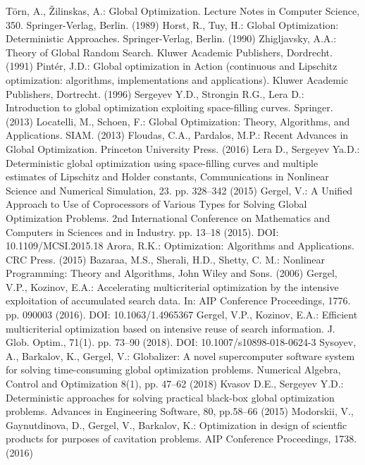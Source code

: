 \documentclass[smallextended]{svjour3}       %
\begin{document}
\begin{thebibliography}{}
 T\"orn, A., {\v Z}ilinskas, A.: Global Optimization. Lecture Notes in Computer Science, 350. Springer-Verlag, Berlin. (1989)
 Horst, R., Tuy, H.: Global Optimization: Deterministic Approaches. Springer-Verlag, Berlin. (1990)
 Zhigljavsky, A.A.: Theory of Global Random Search. Kluwer Academic Publishers, Dordrecht. (1991)
 Pint\'er, J.D.: Global optimization in Action (continuous and Lipschitz optimization: algorithms, implementations and applications). Kluwer Academic Publishers, Dortrecht. (1996)
 Sergeyev Y.D., Strongin R.G., Lera D.: Introduction to global optimization exploiting space-filling curves. Springer. (2013)
 Locatelli, M., Schoen, F.: Global Optimization: Theory, Algorithms, and Applications. SIAM. (2013)
 Floudas, C.A., Pardalos, M.P.: Recent Advances in Global Optimization. Princeton University Press. (2016)
 Lera D., Sergeyev Ya.D.: Deterministic global optimization using space-filling curves and multiple estimates of Lipschitz and Holder constants, Communications in Nonlinear Science and Numerical Simulation, 23. pp. 328--342 (2015)
 Gergel, V.: A Unified Approach to Use of Coprocessors of Various Types for Solving Global Optimization Problems. 2nd International Conference on Mathematics and Computers in Sciences and in Industry. pp. 13--18 (2015). DOI: 10.1109/MCSI.2015.18
 Arora, R.K.: Optimization: Algorithms and Applications. CRC Press. (2015)
 Bazaraa, M.S., Sherali, H.D., Shetty, C. M.: Nonlinear Programming: Theory and Algorithms, John Wiley and Sons. (2006)
 Gergel, V.P., Kozinov, E.A.: Accelerating multicriterial optimization by the intensive exploitation of accumulated search data. In: AIP Conference Proceedings, 1776. pp. 090003 (2016). DOI: 10.1063/1.4965367
 Gergel, V.P., Kozinov, E.A.: Efficient multicriterial optimization based on intensive reuse of search information.  J. Glob. Optim., 71(1). pp. 73--90 (2018). DOI: 10.1007/s10898-018-0624-3
 Sysoyev, A., Barkalov, K., Gergel, V.: Globalizer: A novel supercomputer software system for solving time-consuming global optimization problems. Numerical Algebra, Control and Optimization 8(1), pp. 47--62 (2018)
 Kvasov D.E., Sergeyev Y.D.: Deterministic approaches for solving practical black-box global optimization problems. Advances in Engineering Software, 80, pp.58--66 (2015)
 Modorskii, V., Gaynutdinova, D., Gergel, V., Barkalov, K.: Optimization in design of scientfic products for purposes of cavitation problems. AIP Conference Proceedings, 1738. (2016)

\end{thebibliography}
\end{document}
